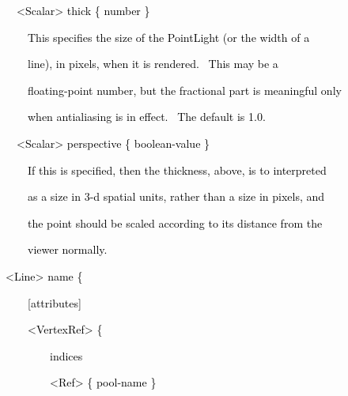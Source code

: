 \documentclass[a4paper]{article}
\newcommand\textstyleOOoComputerKeyWord[1]{\textrm{\textcolor[rgb]{0.0,0.0,0.5019608}{#1}}}
\begin{document}
{\color{black}
\textstyleOOoComputerKeyWord{\textcolor{black}{\ \ {\textless}Scalar{\textgreater} thick \{ number \}}}}


\bigskip

{\color{black}
\textstyleOOoComputerKeyWord{\textcolor{black}{\ \ \ \ This specifies the size of the PointLight (or the width of a}}}

{\color{black}
\textstyleOOoComputerKeyWord{\textcolor{black}{\ \ \ \ line), in pixels, when it is rendered. \ This may be a}}}

{\color{black}
\textstyleOOoComputerKeyWord{\textcolor{black}{\ \ \ \ floating-point number, but the fractional part is meaningful
only}}}

{\color{black}
\textstyleOOoComputerKeyWord{\textcolor{black}{\ \ \ \ when antialiasing is in effect. \ The default is 1.0.}}}


\bigskip

{\color{black}
\textstyleOOoComputerKeyWord{\textcolor{black}{\ \ {\textless}Scalar{\textgreater} perspective \{ boolean-value \}}}}


\bigskip

{\color{black}
\textstyleOOoComputerKeyWord{\textcolor{black}{\ \ \ \ If this is specified, then the thickness, above, is to
interpreted}}}

{\color{black}
\textstyleOOoComputerKeyWord{\textcolor{black}{\ \ \ \ as a size in 3-d spatial units, rather than a size in pixels,
and}}}

{\color{black}
\textstyleOOoComputerKeyWord{\textcolor{black}{\ \ \ \ the point should be scaled according to its distance from the}}}

{\color{black}
\textstyleOOoComputerKeyWord{\textcolor{black}{\ \ \ \ viewer normally.}}}


\bigskip


\bigskip

{\color{black}
\textstyleOOoComputerKeyWord{\textcolor{black}{{\textless}Line{\textgreater} name \{ }}}

{\color{black}
\textstyleOOoComputerKeyWord{\textcolor{black}{\ \ \ \ [attributes] }}}

{\color{black}
\textstyleOOoComputerKeyWord{\textcolor{black}{\ \ \ \ {\textless}VertexRef{\textgreater} \{ }}}

{\color{black}
\textstyleOOoComputerKeyWord{\textcolor{black}{\ \ \ \ \ \ \ \ indices }}}

{\color{black}
\textstyleOOoComputerKeyWord{\textcolor{black}{\ \ \ \ \ \ \ \ {\textless}Ref{\textgreater} \{ pool-name \} }}}
\end{document}
